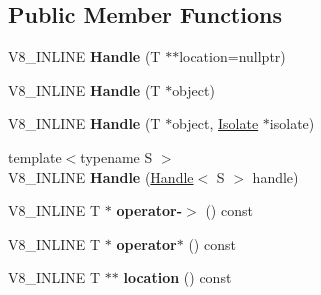 \subsection*{Public Member Functions}
\begin{DoxyCompactItemize}
\item 
V8\+\_\+\+I\+N\+L\+I\+NE {\bfseries Handle} (T $\ast$$\ast$location=nullptr)\hypertarget{classv8_1_1internal_1_1_handle_aae003703e6e94f2220693cf051573e86}{}\label{classv8_1_1internal_1_1_handle_aae003703e6e94f2220693cf051573e86}

\item 
V8\+\_\+\+I\+N\+L\+I\+NE {\bfseries Handle} (T $\ast$object)\hypertarget{classv8_1_1internal_1_1_handle_acd040f051feaec4d69c4a9025c919bda}{}\label{classv8_1_1internal_1_1_handle_acd040f051feaec4d69c4a9025c919bda}

\item 
V8\+\_\+\+I\+N\+L\+I\+NE {\bfseries Handle} (T $\ast$object, \hyperlink{classv8_1_1internal_1_1_isolate}{Isolate} $\ast$isolate)\hypertarget{classv8_1_1internal_1_1_handle_a1a012172ce28683885a29c5397aec853}{}\label{classv8_1_1internal_1_1_handle_a1a012172ce28683885a29c5397aec853}

\item 
{\footnotesize template$<$typename S $>$ }\\V8\+\_\+\+I\+N\+L\+I\+NE {\bfseries Handle} (\hyperlink{classv8_1_1internal_1_1_handle}{Handle}$<$ S $>$ handle)\hypertarget{classv8_1_1internal_1_1_handle_a272121e8322f53f202cdcffb0b14011c}{}\label{classv8_1_1internal_1_1_handle_a272121e8322f53f202cdcffb0b14011c}

\item 
V8\+\_\+\+I\+N\+L\+I\+NE T $\ast$ {\bfseries operator-\/$>$} () const \hypertarget{classv8_1_1internal_1_1_handle_a22f021b1c69738664b4aa8345d77a884}{}\label{classv8_1_1internal_1_1_handle_a22f021b1c69738664b4aa8345d77a884}

\item 
V8\+\_\+\+I\+N\+L\+I\+NE T $\ast$ {\bfseries operator$\ast$} () const \hypertarget{classv8_1_1internal_1_1_handle_ad0d72cb70328f7e7e40de5952bce93ac}{}\label{classv8_1_1internal_1_1_handle_ad0d72cb70328f7e7e40de5952bce93ac}

\item 
V8\+\_\+\+I\+N\+L\+I\+NE T $\ast$$\ast$ {\bfseries location} () const \hypertarget{classv8_1_1internal_1_1_handle_ab3859bc21dac65fe8dec504e3baaf240}{}\label{classv8_1_1internal_1_1_handle_ab3859bc21dac65fe8dec504e3baaf240}

\end{DoxyCompactItemize}
